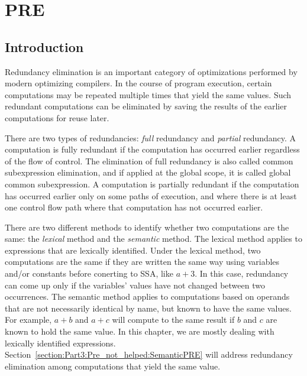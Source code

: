 \chapter{PRE }
\graphicspath{{img/}{pre_not_helped/img/}{part3/pre_not_helped/img/}}

\section{Introduction}

Redundancy elimination is an 
important category of optimizations performed by modern optimizing compilers.
In the course of program execution, certain computations may be repeated
multiple times that yield the same values.  Such redundant
computations can be eliminated by saving the results of the earlier 
computations for reuse later.  

There are two types of redundancies: \emph{full} redundancy and 
\emph{partial} redundancy.  A computation is fully redundant if the 
computation has occurred earlier regardless of the flow of control.
The elimination of full redundancy is also called common subexpression
elimination, and if applied at the global scope, it is called global common
subexpression.  A computation is partially redundant if the computation has
occurred earlier only on some paths of execution, and where there is at
least one control flow path where that computation has not occurred earlier.

There are two different methods to identify whether two computations are the 
same: the \emph{lexical} method and the \emph{semantic} method.  The 
lexical method applies to expressions that are lexically identified.
Under the lexical method, two computations are the same if they
are written the same way using variables and/or constants before conerting
to SSA, like $a+3$.  In this case, redundancy can come up only if the 
variables' values have not changed between two occurrences.
The semantic method applies to computations based on operands that are
not necessarily identical by name, but known to have the same values.
For example, $a+b$ and $a+c$ will compute to the same result
if $b$ and $c$ are known to hold the same value.
In this chapter, we are mostly dealing with lexically identified
expressions.  Section~\ref{section:Part3:Pre_not_helped:SemanticPRE} will
address redundancy elimination among computations that yield the same value.

